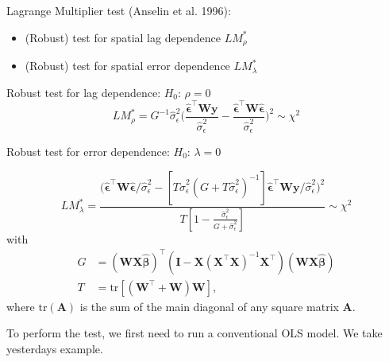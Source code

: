 \documentclass[
  letterpaper,
]{scrbook}
\begin{document}
Lagrange Multiplier test (Anselin et al. 1996):

\begin{itemize}
\item
  (Robust) test for spatial lag dependence \(LM_\rho^*\)
\item
  (Robust) test for spatial error dependence \(LM_\lambda^*\)
\end{itemize}

Robust test for lag dependence: \(H_0\): \(\rho=0\) \[
        LM_\rho^* = G^{-1} \hat{\sigma}_\epsilon^2
        \big(\frac{ \hat{\boldsymbol{\mathbf{\epsilon}}}^\intercal \boldsymbol{\mathbf{Wy}}}{\hat{\sigma}_\epsilon^2}
        - \frac{\hat{\boldsymbol{\mathbf{\epsilon}}}^\intercal \boldsymbol{\mathbf{W\hat{\epsilon}}}}{\hat{\sigma}_\epsilon^2} \big)^2 \sim \chi^2 
\]

Robust test for error dependence: \(H_0\): \(\lambda=0\)

\[
        LM_\lambda^* = \frac{
        \big( \hat{\boldsymbol{\mathbf{\epsilon}}}^\intercal \boldsymbol{\mathbf{W\hat{\epsilon}}} / \hat{\sigma}_\epsilon^2        
        - [T\hat{\sigma}_\epsilon^2(G + T\hat{\sigma}_\epsilon^2)^{-1}]
         \hat{\boldsymbol{\mathbf{\epsilon}}}^\intercal \boldsymbol{\mathbf{Wy}} / \hat{\sigma}_\epsilon^2 \big)^2
        }{
        T[1 - \frac{\hat{\sigma}_\epsilon^2}{G + \hat{\sigma}_\epsilon^2}]
        } \sim \chi^2
\] with \[
\begin{split}
     G &= (\boldsymbol{\mathbf{WX\hat{\beta}}})^\intercal (\boldsymbol{\mathbf{I}} - \boldsymbol{\mathbf{X}} (\boldsymbol{\mathbf{X}}^\intercal\boldsymbol{\mathbf{X}})^{-1} \boldsymbol{\mathbf{X}}^\intercal) (\boldsymbol{\mathbf{WX\hat{\beta}}})   \\
     T &= \mathrm{tr}[(\boldsymbol{\mathbf{W}}^\intercal + \boldsymbol{\mathbf{W}})\boldsymbol{\mathbf{W}}], 
\end{split}     
\] where \(\mathrm{tr}(\boldsymbol{\mathbf{A}})\) is the sum of the main
diagonal of any square matrix \(\boldsymbol{\mathbf{A}}\).

To perform the test, we first need to run a conventional OLS model. We
take yesterdays example.
\end{document}

